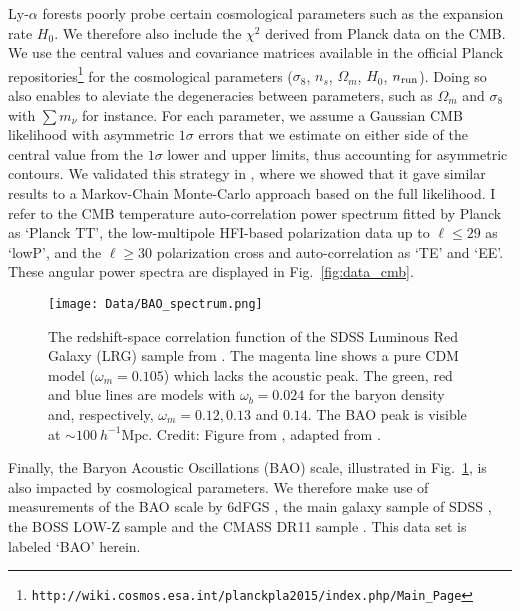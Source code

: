 Ly-$\alpha$ forests poorly probe certain cosmological parameters such as the expansion rate $H_0$. We therefore also include the $\chi^2$ derived from Planck data on the CMB. We use 
 the central values and  covariance matrices available in the official 
 Planck repositories\footnote{\tt http://wiki.cosmos.esa.int/planckpla2015/index.php/Main\_Page}  
for  the cosmological parameters  ($\sigma_8$, $n_s$, $\Omega_m$,  $H_0$, $n_{\rm run}$). Doing so also enables to aleviate the degeneracies between parameters, such as $\Omega_m$ and $\sigma_8$ with $\sum m_\nu$ for instance. For each parameter, we assume a Gaussian CMB likelihood with asymmetric $1\sigma$ errors that we estimate on either side of the central value from the $1\sigma$ lower and upper limits, thus accounting for asymmetric contours. We validated this strategy in \cite{Palanque2015a}, where we showed that it gave similar results to a Markov-Chain Monte-Carlo approach based on the full likelihood. I refer to the CMB temperature auto-correlation power spectrum fitted by Planck as `Planck TT', the low-multipole HFI-based polarization data up to $\ell \leqslant 29$ as `lowP', and the $\ell \geqslant 30$ polarization cross and auto-correlation as `TE' and `EE'. These angular power spectra are displayed in Fig.~\ref{fig:data_cmb}. \\


\begin{figure}
\begin{center}
\texttt{[image: Data/BAO\_spectrum.png]}
\caption{The redshift-space correlation function of the SDSS Luminous Red Galaxy (LRG) sample from \cite{EisensteinBAO}. The magenta line shows a pure CDM model ($\omega_m = 0.105$) which lacks the acoustic peak. The green, red and blue lines are models with $\omega_b = 0.024$ for the baryon density and, respectively, $\omega_m = 0.12, 0.13$ and $0.14$. The BAO peak is visible at $\sim 100~h^{-1}\mathrm{Mpc}$. Credit: Figure from \cite{BAOplot}, adapted from \cite{EisensteinBAO}.}
\label{fig:data_bao}
\end{center}
\end{figure}

Finally, the Baryon Acoustic Oscillations (BAO) scale, illustrated in Fig.~\ref{fig:data_bao}, is also impacted by cosmological parameters. We therefore make use of measurements of the BAO scale by 6dFGS \cite{6dFGS}, the main galaxy sample of SDSS \cite{SDSSmainGalaxy}, the BOSS LOW-Z sample \cite{LOWZ-CMASS} and the CMASS DR11 sample \cite{LOWZ-CMASS}. This data set is labeled `BAO' herein.

\clearpage